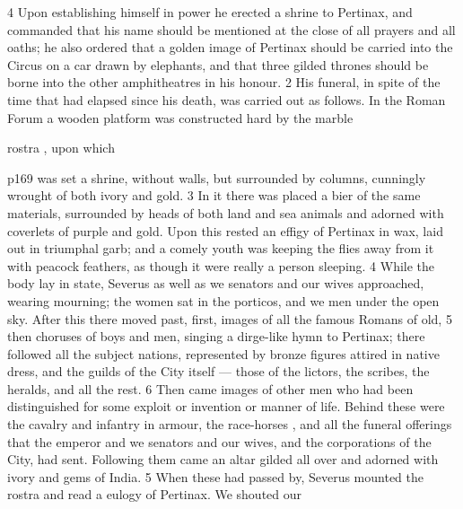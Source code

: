 4
Upon establishing himself in power he erected a shrine to Pertinax, and commanded that his name should be mentioned at the close of all prayers and all oaths; he also ordered that a golden image of Pertinax should be carried into the Circus on a car drawn by elephants, and that three gilded thrones should be borne into the other amphitheatres in his honour. 2 His funeral, in spite of the time that had elapsed since his death, was carried out as follows.  In the Roman Forum a wooden platform was constructed hard by the marble

rostra , upon which

p169 was set a shrine, without walls, but surrounded by columns, cunningly wrought of both ivory and gold. 3 In it there was placed a bier of the same materials, surrounded by heads of both land and sea animals and adorned with coverlets of purple and gold. Upon this rested an effigy of Pertinax in wax, laid out in triumphal garb; and a comely youth was keeping the flies away from it with peacock feathers, as though it were really a person sleeping. 4 While the body lay in state, Severus as well as we senators and our wives approached, wearing mourning; the women sat in the porticos, and we men under the open sky. After this there moved past, first, images of all the famous Romans of old, 5 then choruses of boys and men, singing a dirge-like hymn to Pertinax; there followed all the subject nations, represented by bronze figures attired in native dress, and the guilds of the City itself \texthebrew{—} those of the lictors, the scribes, the heralds, and all the rest. 6 Then came images of other men who had been distinguished for some exploit or invention or manner of life. Behind these were the cavalry and infantry in armour, the race-horses , and all the funeral offerings that the emperor and we senators and our wives, and the corporations of the City, had sent. Following them came an altar gilded all over and adorned with ivory and gems of India.
5
When these had passed by, Severus mounted the rostra and read a eulogy of Pertinax. We shouted our

